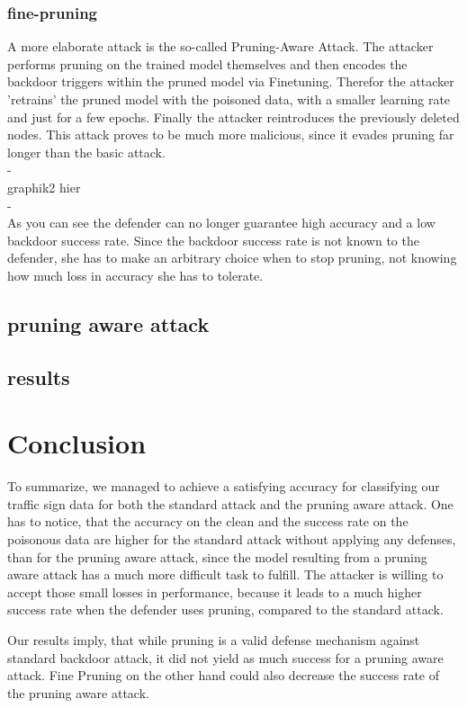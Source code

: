 \documentclass[a4paper,12pt]{report}
\begin{document}
\subsection{fine-pruning}
A more elaborate attack is the so-called Pruning-Aware Attack. The attacker performs pruning on the trained model themselves and then encodes the backdoor triggers within the pruned model via Finetuning. Therefor the attacker 'retrains' the pruned model with the poisoned data, with a smaller learning rate and just for a few epochs. Finally the attacker reintroduces the previously deleted nodes. This attack proves to be much more malicious, since it evades pruning far longer than the basic attack.
\\
-\\
graphik2 hier\\
-\\
As you can see the defender can no longer guarantee high accuracy and a low backdoor success rate. Since the backdoor success rate is not known to the defender, she has to make an arbitrary choice when to stop pruning, not knowing how much loss in accuracy she has to tolerate.
\section{pruning aware attack}

\section{results}


\chapter{Conclusion}
To summarize, we managed to achieve a satisfying accuracy for classifying our traffic sign data for both the standard attack and the pruning aware attack. One has to notice, that  the accuracy on the clean and the success rate on the poisonous data are higher for the standard attack without applying any defenses, than for the pruning aware attack, since the model resulting from a pruning aware attack has a much more difficult task to fulfill. The attacker is willing to accept those small losses in performance, because it leads to a much higher success rate when the defender uses pruning, compared to the standard attack.

Our results imply, that while pruning is a valid defense mechanism against standard backdoor attack, it did not yield as much success for a pruning aware attack. Fine Pruning on the other hand could also decrease the success rate of the pruning aware attack.
\end{document}
